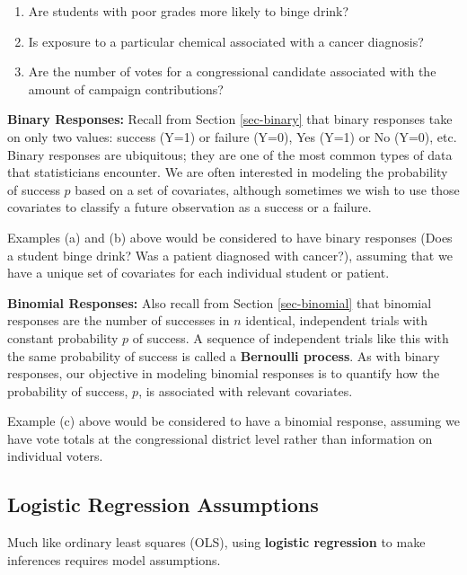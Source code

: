\documentclass[
]{krantz}
\providecommand{\tightlist}{%
  \setlength{\itemsep}{0pt}\setlength{\parskip}{0pt}}
\begin{document}
\begin{enumerate}
\def\labelenumi{\alph{enumi}.}
\tightlist
\item
  Are students with poor grades more likely to binge drink?
\item
  Is exposure to a particular chemical associated with a cancer diagnosis?
\item
  Are the number of votes for a congressional candidate associated with the amount of campaign contributions?
\end{enumerate}

\textbf{Binary Responses:} Recall from Section \ref{sec-binary} that binary responses take on only two values: success (Y=1) or failure (Y=0), Yes (Y=1) or No (Y=0), etc. Binary responses are ubiquitous; they are one of the most common types of data that statisticians encounter. We are often interested in modeling the probability of success \(p\) based on a set of covariates, although sometimes we wish to use those covariates to classify a future observation as a success or a failure.

Examples (a) and (b) above would be considered to have binary responses (Does a student binge drink? Was a patient diagnosed with cancer?), assuming that we have a unique set of covariates for each individual student or patient.

\textbf{Binomial Responses:} Also recall from Section \ref{sec-binomial} that binomial responses are the number of successes in \(n\) identical, independent trials with constant probability \(p\) of success. A sequence of independent trials like this with the same probability of success is called a \textbf{Bernoulli process}.  As with binary responses, our objective in modeling binomial responses is to quantify how the probability of success, \(p\), is associated with relevant covariates.

Example (c) above would be considered to have a binomial response, assuming we have vote totals at the congressional district level rather than information on individual voters.

\hypertarget{logistic-regression-assumptions}{%
\subsection{Logistic Regression Assumptions}\label{logistic-regression-assumptions}}

Much like ordinary least squares (OLS), using \textbf{logistic regression}  to make inferences requires model assumptions.
\end{document}
